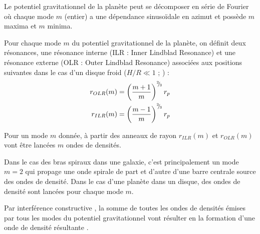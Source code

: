 

Le potentiel gravitationnel de la planète peut se décomposer en série de Fourier où chaque mode $m$ (entier) a une dépendance sinusoïdale en azimut et possède $m$ maxima et $m$ minima. 

Pour chaque mode $m$ du potentiel gravitationnel de la planète, on définit deux résonances, une résonance interne (ILR : Inner Lindblad Resonance) et une résonance externe (OLR : Outer Lindblad Resonance) associées aux positions suivantes dans le cas d'un disque froid ($H/R\ll 1$ ; \cite{ward1997protoplanet}) : 
\begin{subequations}
\begin{align}
r_{OLR}(m) &= \left(\frac{m+1}{m}\right)^{{}^{2\!\!}/ _{\!3}}r_p\\
r_{ILR}(m) &= \left(\frac{m-1}{m}\right)^{{}^{2\!\!}/ _{\!3}}r_p
\end{align}
\end{subequations}

Pour un mode $m$ donnée, à partir des anneaux de rayon $r_{ILR}(m)$ et $r_{OLR}(m)$ vont être lancées $m$ ondes de densités. 

Dans le cas des bras spiraux dans une galaxie, c'est principalement un mode $m=2$ qui propage une onde spirale de part et d'autre d'une barre centrale source des ondes de densité. Dans le cas d'une planète dans un disque, des ondes de densité sont lancées pour chaque mode $m$. 

Par interférence constructive \citep{ogilvie2002wake}, la somme de toutes les ondes de densités émises par tous les modes du potentiel gravitationnel vont résulter en la formation d'une onde de densité résultante . 

